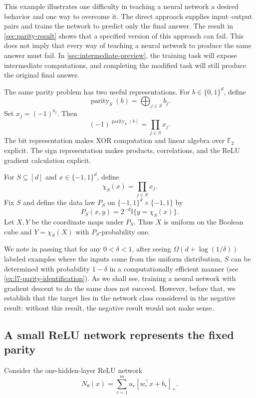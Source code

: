 \documentclass[11pt,twoside]{article}
\newcommand{\I}{\mathbb I}
\theoremstyle{definition}
\theoremstyle{remark}
\begin{document}
This example illustrates one difficulty in teaching a neural network a
desired behavior and one way to overcome it. The direct approach supplies
input--output pairs and trains the network to predict only the final answer.
The result in \cref{sec:parity-result} shows that a specified version of this
approach can fail. This does not imply that every way of teaching a neural
network to produce the same answer must fail. In \cref{sec:intermediate-preview}, the
training task will expose intermediate computations, and completing the
modified task will still produce the original final answer.

The same parity problem has two useful representations. For
$b\in\{0,1\}^d$, define
\[
 \operatorname{parity}_S(b)=\bigoplus_{j\in S}b_j.
\]
Set $x_j=(-1)^{b_j}$. Then
\begin{equation}
 (-1)^{\operatorname{parity}_S(b)}
 =\prod_{j\in S}x_j.
\label{eq:parity-representations}
\end{equation}
The bit representation makes XOR computation and linear algebra over
$\mathbb F_2$ explicit. The sign representation makes products, correlations,
and the ReLU gradient calculation explicit.

For $S\subseteq[d]$ and $x\in\{-1,1\}^d$, define
\[
\chi_S(x)=\prod_{j\in S}x_j.
\]
Fix $S$ and define the data law $P_S$ on
$\{-1,1\}^d\times\{-1,1\}$ by
\[
 P_S(x,y)=2^{-d}\I\{y=\chi_S(x)\}.
\]
Let $X,Y$ be the coordinate maps under $P_S$. Thus $X$ is uniform on the
Boolean cube and $Y=\chi_S(X)$ with $P_S$-probability one.

We note in passing that for any $0<\delta<1$,
after seeing $\Omega(d+ \log(1/\delta))$ labeled examples
where the inputs come from the uniform distribution,
$S$ can be determined with probability $1-\delta$ in a computationally
efficient manner (see
\cref{ex:l7-parity-identification}).
As we shall see, training a neural network with gradient descent
to do the same does not succeed. However, before that, we establish that the target
lies  in the network class considered in the negative result: without this result,
the negative result would not make sense.

\subsection{A small ReLU network represents the fixed parity}

Consider the one-hidden-layer ReLU network
\begin{equation}
N_\theta(x)=\sum_{r=1}^m u_r[w_r^\top x+b_r]_+.
\label{eq:relu-network}
\end{equation}
\end{document}
